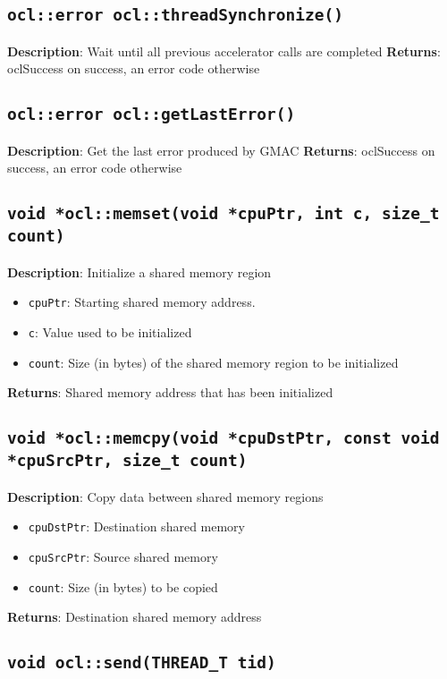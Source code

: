 \subsection{\texttt{ocl::error ocl::threadSynchronize()}}

\textbf{Description}: Wait until all previous accelerator calls are completed
\textbf{Returns}: oclSuccess on success, an error code otherwise

\subsection{\texttt{ocl::error ocl::getLastError()}}

\textbf{Description}: Get the last error produced by GMAC
\textbf{Returns}: oclSuccess on success, an error code otherwise

\subsection{\texttt{void *ocl::memset(void *cpuPtr, int c, size\_t count)}}

\textbf{Description}: Initialize a shared memory region
\begin{itemize}
  \item \texttt{cpuPtr}: Starting shared memory address.
  \item \texttt{c}: Value used to be initialized
  \item \texttt{count}: Size (in bytes) of the shared memory region to be initialized
\end{itemize}
\textbf{Returns}: Shared memory address that has been initialized

\subsection{\texttt{void *ocl::memcpy(void *cpuDstPtr, const void *cpuSrcPtr, size\_t count)}}

\textbf{Description}: Copy data between shared memory regions
\begin{itemize}
  \item \texttt{cpuDstPtr}: Destination shared memory
  \item \texttt{cpuSrcPtr}: Source shared memory
  \item \texttt{count}: Size (in bytes) to be copied
\end{itemize}
\textbf{Returns}: Destination shared memory address

\subsection{\texttt{void ocl::send(THREAD\_T tid)}}

